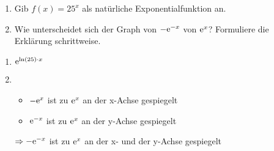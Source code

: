 \begin{enumerate}
	\item Gib $f(x)=25^x$ als natürliche Exponentialfunktion an.
	\item	Wie unterscheidet sich der Graph von $-\mathrm{e}^{-x}$ von $\mathrm{e}^x$? Formuliere die Erklärung schrittweise.
\end{enumerate}
\begin{lsg}{}
	\begin{enumerate}
		\item $\mathrm{e}^{\ln(25)\cdot x}$
		\item 	\begin{itemize}
					\item $-\mathrm{e}^x$ ist zu $ \mathrm{e}^x$ an der x-Achse gespiegelt
					\item $\mathrm{e}^{-x}$ ist zu $\mathrm{e}^x$ an der y-Achse gespiegelt
				\end{itemize}
				$\Rightarrow -\mathrm{e}^{-x}$ ist zu $\mathrm{e}^x$ an der x- und der y-Achse gespiegelt
	\end{enumerate}
\end{lsg}

